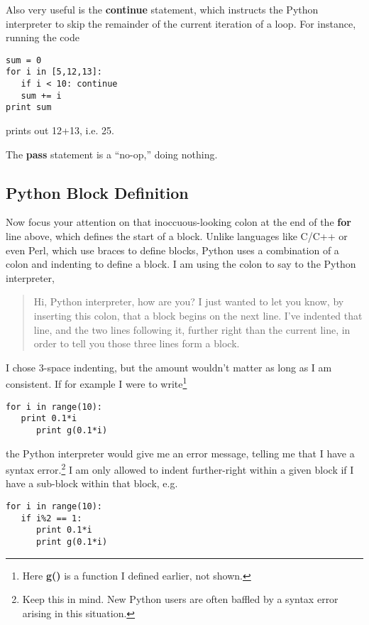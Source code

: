 Also very useful is the {\bf continue} statement, which instructs the
Python interpreter to skip the remainder of the current iteration of a
loop.  For instance, running the code

\begin{Verbatim}[fontsize=\relsize{-2}]
sum = 0
for i in [5,12,13]:
   if i < 10: continue
   sum += i
print sum
\end{Verbatim}

prints out 12+13, i.e. 25.

The {\bf pass} statement is a ``no-op,'' doing nothing.

\subsection{Python Block Definition} 

Now focus your attention on that inoccuous-looking colon at the end of
the {\bf for} line above, which defines the start of a block.  Unlike
languages like C/C++ or even Perl, which use braces to define blocks,
Python uses a combination of a colon and indenting to define a block.  I
am using the colon to say to the Python interpreter,

\begin{quote}

Hi, Python interpreter, how are you?  I just wanted to let you know, by
inserting this colon, that a block begins on the next line.  I've
indented that line, and the two lines following it, further right than
the current line, in order to tell you those three lines form a block.  

\end{quote}

I chose 3-space indenting, but the amount wouldn't matter as long as I
am consistent.  If for example I were to write\footnote{Here {\bf g()}
is a function I defined earlier, not shown.}

\begin{Verbatim}[fontsize=\relsize{-2}]
for i in range(10):
   print 0.1*i
      print g(0.1*i)
\end{Verbatim}

the Python interpreter would give me an error message, telling me that I
have a syntax error.\footnote{Keep this in mind.  New Python users are
often baffled by a syntax error arising in this situation.}  I am only
allowed to indent further-right within a given block if I have a
sub-block within that block, e.g.

\begin{Verbatim}[fontsize=\relsize{-2}]
for i in range(10):
   if i%2 == 1:  
      print 0.1*i
      print g(0.1*i)
\end{Verbatim}

